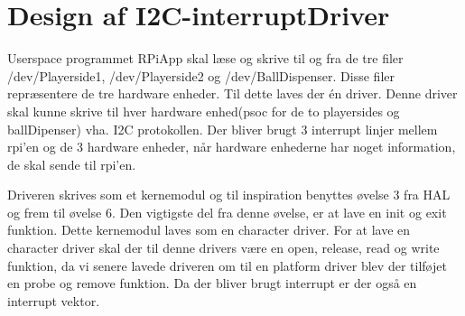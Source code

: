 \documentclass[Softwaredesign/Softwaredesign_main.tex]{subfiles}
\begin{document}
\section{Design af I2C-interruptDriver}\label{sec:I2C_interruptDriver_design_bilag}
Userspace programmet RPiApp skal læse og skrive til og fra de tre filer /dev/Playerside1, /dev/Playerside2 og /dev/BallDispenser. Disse filer repræsentere de tre hardware enheder. Til dette laves der én driver. Denne driver skal kunne skrive til hver hardware enhed(psoc for de to playersides og ballDipenser) vha. I2C protokollen. Der bliver brugt 3 interrupt linjer mellem rpi'en og de 3 hardware enheder, når hardware enhederne har noget information, de skal sende til rpi'en. 

Driveren skrives som et kernemodul og til inspiration benyttes øvelse 3 fra HAL og frem til øvelse 6. Den vigtigste del fra denne øvelse, er at lave en init og exit funktion. Dette kernemodul laves som en character driver. For at lave en character driver skal der til denne drivers være en open, release, read og write funktion, da vi senere lavede driveren om til en platform driver blev der tilføjet en probe og remove funktion. Da der bliver brugt interrupt er der også en interrupt vektor.
\end{document}
